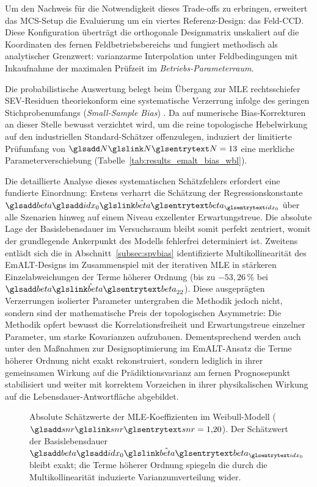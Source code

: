 Um den Nachweis für die Notwendigkeit dieses Trade-offs zu erbringen, erweitert das \ac{MCS}-Setup die Evaluierung um ein viertes Referenz-Design: das Feld-\ac{CCD}.
Diese Konfiguration überträgt die orthogonale Designmatrix unskaliert auf die Koordinaten des fernen Feldbetriebsbereichs und fungiert methodisch als analytischer Grenzwert: varianzarme Interpolation unter Feldbedingungen mit Inkaufnahme der maximalen Prüfzeit im \textit{Betriebs-Parameterraum}.

Die probabilistische Auswertung belegt beim Übergang zur \ac{MLE} rechtsschiefer \ac{SEV}-Residuen theoriekonform eine systematische Verzerrung infolge des geringen Stichprobenumfangs (\textit{Small-Sample Bias}) \cite{Meeker.2022}.
Da auf numerische Bias-Korrekturen an dieser Stelle bewusst verzichtet wird, um die reine topologische Hebelwirkung auf den industriellen Standard-Schätzer offenzulegen, induziert der limitierte Prüfumfang von $\sym{N}=13$ eine merkliche Parameterverschiebung (Tabelle~\ref{tab:results_emalt_bias_wbl}).



Die detaillierte Analyse dieses systematischen Schätzfehlers erfordert eine fundierte Einordnung:
Erstens verharrt die Schätzung der Regressionskonstante $\hat{\symsub{beta}{idx_0}}$ über alle Szenarien hinweg auf einem Niveau exzellenter Erwartungstreue.
Die absolute Lage der Basislebensdauer im Versuchsraum bleibt somit perfekt zentriert, womit der grundlegende Ankerpunkt des Modells fehlerfrei determiniert ist.
Zweitens entlädt sich die in Abschnitt~\ref{subsec:spvbias} identifizierte Multikollinearität des \ac{EmALT}-Designs im Zusammenspiel mit der iterativen \ac{MLE} in stärkeren Einzelabweichungen der Terme höherer Ordnung (bis zu $-53{,}26\,\%$ bei $\hat{\sym{beta}}_{22}$).
Diese ausgeprägten Verzerrungen isolierter Parameter untergraben die Methodik jedoch nicht, sondern sind der mathematische Preis der topologischen Asymmetrie: Die Methodik opfert bewusst die Korrelationsfreiheit und Erwartungstreue einzelner Parameter, um starke Kovarianzen aufzubauen.
Dementsprechend werden auch unter den Maßnahmen zur Designoptimierung im \ac{EmALT}-Ansatz die Terme höherer Ordnung nicht exakt rekonstruiert, sondern lediglich in ihrer gemeinsamen Wirkung auf die Prädiktionsvarianz am fernen Prognosepunkt stabilisiert und weiter mit korrektem Vorzeichen in ihrer physikalischen Wirkung auf die Lebensdauer-Antwortfläche abgebildet.

\begin{figure}[htbp]
    \centering
    \setlength{}
    \setlength\figureheight{5cm}
    
    \caption{Absolute Schätzwerte der \ac{MLE}-Koeffizienten im Weibull-Modell ($\sym{snr}=1{,}20$). Der Schätzwert der Basislebensdauer $\hat{\symsub{beta}{idx_0}}$ bleibt exakt; die Terme höherer Ordnung spiegeln die durch die Multikollinearität induzierte Varianzumverteilung wider.}
    \label{fig:ma_abb5.4.3_betadev_wbl}
\end{figure}

